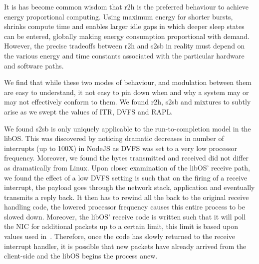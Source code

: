 It is has become common wisdom that r2h is the preferred behaviour to achieve energy proportional computing.  
Using maximum energy for shorter bursts, shrinks compute time and enables larger idle gaps in which deeper sleep states can be entered, globally making energy consumption proportional with demand.  
However, the precise tradeoffs between r2h and s2sb in reality must depend on the various energy and time constants associated with the particular hardware and software paths. 

We find that while these two modes of behaviour, and modulation between them  are easy to understand, it not easy to pin down when and why a system may or may not effectively conform to them.  We found r2h, s2sb and mixtures to subtly arise as we swept the values of ITR, DVFS and RAPL.  

We found s2sb is only uniquely applicable to the run-to-completion model in the libOS. This was discovered by noticing dramatic decreases in number of interrupts (up to 100X) in NodeJS as DVFS was set to a very low processor frequency. Moreover, we found the bytes transmitted and received did not differ as dramatically from Linux. Upon closer examination of the libOS' receive path, we found the effect of a low DVFS setting is such that on the firing of a receive interrupt, the payload goes through the network stack, application and eventually transmits a reply back. It then has to rewind all the back to the original receive handling code, the lowered processor frequency causes this entire process to be slowed down. Moreover, the libOS' receive code is written such that it will poll the NIC for additional packets up to a certain limit, this limit is based upon values used in~\cite{arrakis,debianixgbe}. Therefore, once the code has slowly returned to the receive interrupt handler, it is possible that new packets have already arrived from the client-side and the libOS begins the process anew. 



